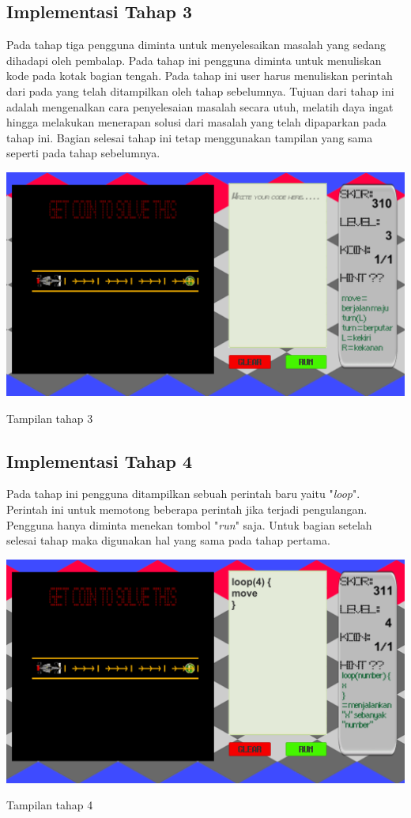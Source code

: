 	\subsection{Implementasi Tahap 3}
	Pada tahap tiga pengguna diminta untuk menyelesaikan masalah yang sedang dihadapi oleh pembalap. Pada tahap ini pengguna diminta untuk menuliskan kode pada kotak bagian tengah. Pada tahap ini user harus menuliskan perintah dari pada yang telah ditampilkan oleh tahap sebelumnya. Tujuan dari tahap ini adalah mengenalkan cara penyelesaian masalah secara utuh, melatih daya ingat hingga melakukan menerapan solusi dari masalah yang telah dipaparkan pada tahap ini. Bagian selesai tahap ini tetap menggunakan tampilan yang sama seperti pada tahap sebelumnya.
	\begin{table}
		\centering
		\includegraphics[width=\linewidth-40pt]{pics/prototipe/tahap3}
		\caption{Tampilan tahap 3}
	\end{table}
	\subsection{Implementasi Tahap 4}
	Pada tahap ini pengguna ditampilkan sebuah perintah baru yaitu "\textit{loop}". Perintah ini untuk memotong beberapa perintah jika terjadi pengulangan. Pengguna hanya diminta menekan tombol "\textit{run}" saja. Untuk bagian setelah selesai tahap maka digunakan hal yang sama pada tahap pertama.
	\begin{table}
		\centering
		\includegraphics[width=\linewidth-40pt]{pics/prototipe/tahap4}
		\caption{Tampilan tahap 4}
	\end{table}
